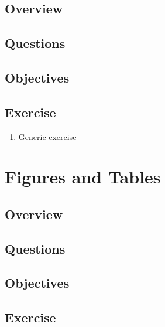 \documentclass[]{article}
\providecommand{\tightlist}{%
  \setlength{\itemsep}{0pt}\setlength{\parskip}{0pt}}
\begin{document}
\hypertarget{overview-2}{%
\subsection{Overview}\label{overview-2}}

\hypertarget{questions-2}{%
\subsection{Questions}\label{questions-2}}

\hypertarget{objectives-1}{%
\subsection{Objectives}\label{objectives-1}}

\hypertarget{exercise}{%
\subsection{Exercise}\label{exercise}}

\begin{enumerate}
\def\labelenumi{\arabic{enumi}.}
\tightlist
\item
  Generic exercise
\end{enumerate}

\hypertarget{figures-and-tables}{%
\section{Figures and Tables}\label{figures-and-tables}}

\hypertarget{overview-3}{%
\subsection{Overview}\label{overview-3}}

\hypertarget{questions-3}{%
\subsection{Questions}\label{questions-3}}

\hypertarget{objectives-2}{%
\subsection{Objectives}\label{objectives-2}}

\hypertarget{exercise-1}{%
\subsection{Exercise}\label{exercise-1}}
\end{document}
